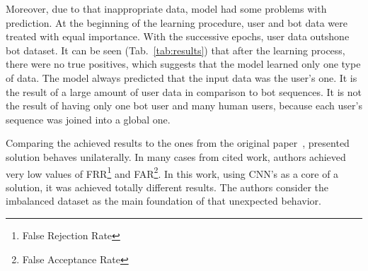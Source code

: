 Moreover, due to that inappropriate data, model had some problems with prediction.
At the beginning of the learning procedure, user and bot data were treated with equal importance.
With the successive epochs, user data outshone bot dataset.
It can be seen \mbox{(Tab.~\ref{tab:results})} that after the learning process, there were no true positives, which suggests that the model learned only one type of data.
The model always predicted that the input data was the user's one.
It is the result of a large amount of user data in comparison to bot sequences.
It is not the result of having only one bot user and many human users, because each user's sequence was joined into a global one.

Comparing the achieved results to the ones from the original paper~\cite{Main}, presented solution behaves unilaterally.
In many cases from cited work, authors achieved very low values of FRR\footnote{False Rejection Rate} and FAR\footnote{False Acceptance Rate}\@.
In this work, using CNN's as a core of a solution, it was achieved totally different results.
The authors consider the imbalanced dataset as the main foundation of that unexpected behavior.


